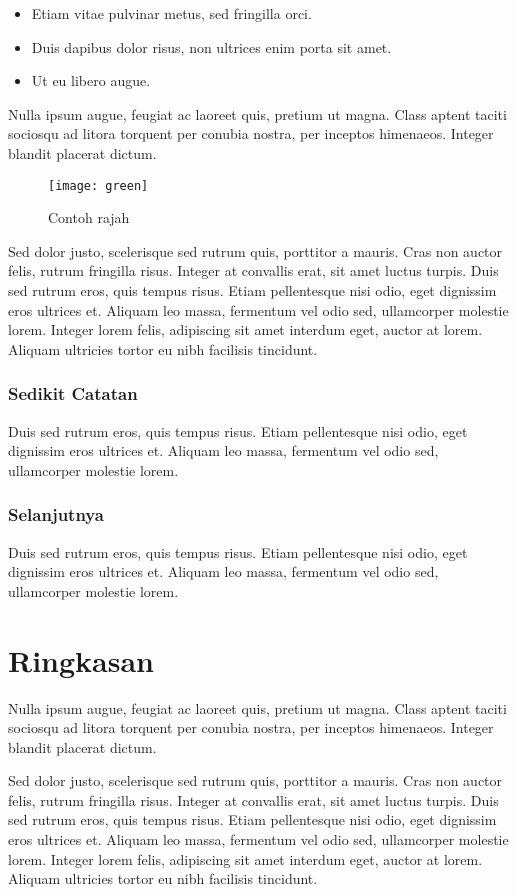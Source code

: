 \begin{itemize}
\item Etiam vitae pulvinar metus, sed fringilla orci.
\item Duis dapibus dolor risus, non ultrices enim porta sit amet.
\item Ut eu libero augue.
\end{itemize}

Nulla ipsum augue, feugiat ac laoreet quis, pretium ut magna. Class aptent taciti sociosqu ad litora torquent per conubia nostra, per inceptos himenaeos. Integer blandit placerat dictum.

\begin{figure}[hbt!]\centering
\texttt{[image: green]}
\caption{Contoh rajah}
\end{figure}

Sed dolor justo, scelerisque sed rutrum quis, porttitor a mauris. Cras non auctor felis, rutrum fringilla risus. Integer at convallis erat, sit amet luctus turpis. Duis sed rutrum eros, quis tempus risus. Etiam pellentesque nisi odio, eget dignissim eros ultrices et. Aliquam leo massa, fermentum vel odio sed, ullamcorper molestie lorem. Integer lorem felis, adipiscing sit amet interdum eget, auctor at lorem. Aliquam ultricies tortor eu nibh facilisis tincidunt.


\subsubsection{Sedikit Catatan}

Duis sed rutrum eros, quis tempus risus. Etiam pellentesque nisi odio, eget dignissim eros ultrices et. Aliquam leo massa, fermentum vel odio sed, ullamcorper molestie lorem.

\subsubsection{Selanjutnya}
Duis sed rutrum eros, quis tempus risus. Etiam pellentesque nisi odio, eget dignissim eros ultrices et. Aliquam leo massa, fermentum vel odio sed, ullamcorper molestie lorem.


\section{Ringkasan}
Nulla ipsum augue, feugiat ac laoreet quis, pretium ut magna. Class aptent taciti sociosqu ad litora torquent per conubia nostra, per inceptos himenaeos. Integer blandit placerat dictum.

Sed dolor justo, scelerisque sed rutrum quis, porttitor a mauris. Cras non auctor felis, rutrum fringilla risus. Integer at convallis erat, sit amet luctus turpis. Duis sed rutrum eros, quis tempus risus. Etiam pellentesque nisi odio, eget dignissim eros ultrices et. Aliquam leo massa, fermentum vel odio sed, ullamcorper molestie lorem. Integer lorem felis, adipiscing sit amet interdum eget, auctor at lorem. Aliquam ultricies tortor eu nibh facilisis tincidunt.
